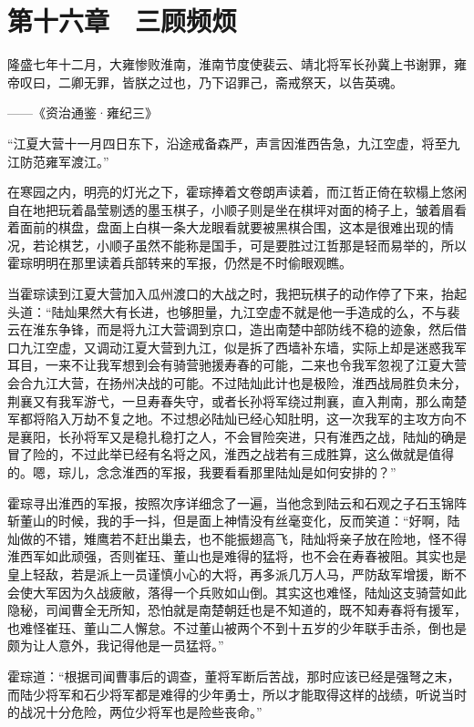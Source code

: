 \chapter{第十六章　三顾频烦}

隆盛七年十二月，大雍惨败淮南，淮南节度使裴云、靖北将军长孙冀上书谢罪，雍帝叹曰，二卿无罪，皆朕之过也，乃下诏罪己，斋戒祭天，以告英魂。

——《资治通鉴·雍纪三》

“江夏大营十一月四日东下，沿途戒备森严，声言因淮西告急，九江空虚，将至九江防范雍军渡江。”

在寒园之内，明亮的灯光之下，霍琮捧着文卷朗声读着，而江哲正倚在软榻上悠闲自在地把玩着晶莹剔透的墨玉棋子，小顺子则是坐在棋坪对面的椅子上，皱着眉看着面前的棋盘，盘面上白棋一条大龙眼看就要被黑棋合围，这本是很难出现的情况，若论棋艺，小顺子虽然不能称是国手，可是要胜过江哲那是轻而易举的，所以霍琮明明在那里读着兵部转来的军报，仍然是不时偷眼观瞧。

当霍琮读到江夏大营加入瓜州渡口的大战之时，我把玩棋子的动作停了下来，抬起头道：“陆灿果然大有长进，也够胆量，九江空虚不就是他一手造成的么，不与裴云在淮东争锋，而是将九江大营调到京口，造出南楚中部防线不稳的迹象，然后借口九江空虚，又调动江夏大营到九江，似是拆了西墙补东墙，实际上却是迷惑我军耳目，一来不让我军想到会有骑营驰援寿春的可能，二来也令我军忽视了江夏大营会合九江大营，在扬州决战的可能。不过陆灿此计也是极险，淮西战局胜负未分，荆襄又有我军游弋，一旦寿春失守，或者长孙将军绕过荆襄，直入荆南，那么南楚军都将陷入万劫不复之地。不过想必陆灿已经心知肚明，这一次我军的主攻方向不是襄阳，长孙将军又是稳扎稳打之人，不会冒险突进，只有淮西之战，陆灿的确是冒了险的，不过此举已经有名将之风，淮西之战若有三成胜算，这么做就是值得的。嗯，琮儿，念念淮西的军报，我要看看那里陆灿是如何安排的？”

霍琮寻出淮西的军报，按照次序详细念了一遍，当他念到陆云和石观之子石玉锦阵斩董山的时候，我的手一抖，但是面上神情没有丝毫变化，反而笑道：“好啊，陆灿做的不错，雉鹰若不赶出巢去，也不能振翅高飞，陆灿将亲子放在险地，怪不得淮西军如此顽强，否则崔珏、董山也是难得的猛将，也不会在寿春被阻。其实也是皇上轻敌，若是派上一员谨慎小心的大将，再多派几万人马，严防敌军增援，断不会使大军因为久战疲敝，落得一个兵败如山倒。其实这也难怪，陆灿这支骑营如此隐秘，司闻曹全无所知，恐怕就是南楚朝廷也是不知道的，既不知寿春将有援军，也难怪崔珏、董山二人懈怠。不过董山被两个不到十五岁的少年联手击杀，倒也是颇为让人意外，我记得他是一员猛将。”

霍琮道：“根据司闻曹事后的调查，董将军断后苦战，那时应该已经是强弩之末，而陆少将军和石少将军都是难得的少年勇士，所以才能取得这样的战绩，听说当时的战况十分危险，两位少将军也是险些丧命。”

